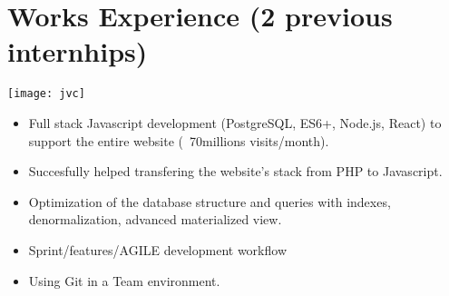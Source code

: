 
\section{Works Experience (2 previous internhips)}
\begin{minipage}{.15\textwidth}
    \centerline{\texttt{[image: jvc]}}
\end{minipage}%
\hspace{5mm}
\begin{minipage}{.9\textwidth}
    \raggedright
    \begin{minipage}[t]{0.6\textwidth}
        \begin{itemize}
            \item Full stack Javascript development (PostgreSQL, ES6+, Node.js, React) to support the entire website (~70millions visits/month).
            \item Succesfully helped transfering the website's stack from PHP to Javascript.
            \item Optimization of the database structure and queries with indexes, denormalization, advanced materialized view.
            \item Sprint/features/AGILE development workflow
            \item Using Git in a Team environment.
        \end{itemize}
    \end{minipage}
\end{minipage}
